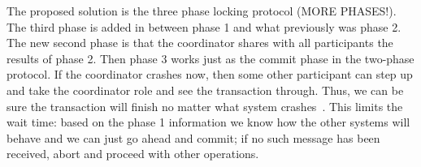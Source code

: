 The proposed solution is the three phase locking protocol (MORE PHASES!). The third phase is added in between phase 1 and what previously was phase 2. The new second phase is that the coordinator shares with all participants the results of phase 2. Then phase 3 works just as the commit phase in the two-phase protocol. If the coordinator crashes now, then some other participant can step up and take the coordinator role and see the transaction through. Thus, we can be sure the transaction will finish no matter what system crashes~\cite{fds}. This limits the wait time: based on the phase 1 information we know how the other systems will behave and we can just go ahead and commit; if no such message has been received, abort and proceed with other operations.




